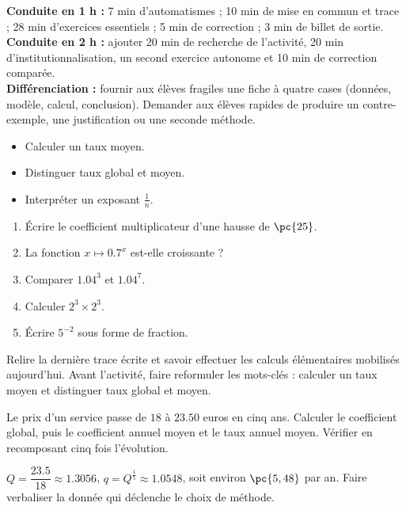 \ifmxteacher
\begin{method}
\textbf{Conduite en 1 h :} 7 min d'automatismes ; 10 min de mise en commun et trace ; 28 min d'exercices essentiels ; 5 min de correction ; 3 min de billet de sortie.\\
\textbf{Conduite en 2 h :} ajouter 20 min de recherche de l'activité, 20 min d'institutionnalisation, un second exercice autonome et 10 min de correction comparée.\\
\textbf{Différenciation :} fournir aux élèves fragiles une fiche à quatre cases (données, modèle, calcul, conclusion). Demander aux élèves rapides de produire un contre-exemple, une justification ou une seconde méthode.
\end{method}
\fi
{}
\begin{objectives}\begin{itemize}\item Calculer un taux moyen.\item Distinguer taux global et moyen.\item Interpréter un exposant $\frac1n$.\end{itemize}\end{objectives}
\begin{fluency}\begin{enumerate}\item Écrire le coefficient multiplicateur d'une hausse de $\pc{25}$. \item La fonction $x\mapsto\num{0,7}^x$ est-elle croissante ? \item Comparer $\num{1,04}^3$ et $\num{1,04}^7$. \item Calculer $2^3\times2^3$. \item Écrire $5^{-2}$ sous forme de fraction. \end{enumerate}\end{fluency}
\begin{prerequisites}Relire la dernière trace écrite et savoir effectuer les calculs élémentaires mobilisés aujourd'hui. Avant l'activité, faire reformuler les mots-clés : calculer un taux moyen et distinguer taux global et moyen.\end{prerequisites}

\begin{activity}
Le prix d'un service passe de $18$ à $\num{23,50}$ euros en cinq ans. Calculer le coefficient global, puis le coefficient annuel moyen et le taux annuel moyen. Vérifier en recomposant cinq fois l'évolution.

\end{activity}
\begin{solution}$Q=\dfrac{\num{23,5}}{18}\approx\num{1,3056}$, $q=Q^{\frac15}\approx\num{1,0548}$, soit environ $\pc{5,48}$ par an. Faire verbaliser la donnée qui déclenche le choix de méthode.\end{solution}

